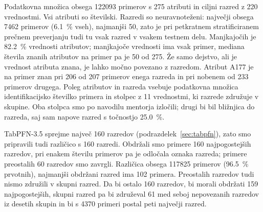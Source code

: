 \documentclass[a4paper,12pt,openright]{book}
\begin{document}
Podatkovna množica obsega \num{122093} primerov s 275 atributi in ciljni
razred z 220 vrednostmi. Vsi atributi so številski. Razredi so neuravnoteženi:
največji obsega 7462 primerov (\SI{6.1}{\percent} vseh), najmanjši 50, zato je
pri petkratnem stratificiranem prečnem preverjanju tudi tu vsak razred v
vsakem testnem delu. Manjkajočih je \SI{82.2}{\percent} vrednosti atributov;
manjkajoče vrednosti ima vsak primer, mediana števila znanih atributov na
primer pa je 50 od 275. Že samo dejstvo, ali je vrednost atributa znana, je
lahko močno povezano z razredom. Atribut A177 je na primer znan pri 206 od 207
primerov enega razreda in pri nobenem od 233 primerov drugega.
Poleg atributov in razreda vsebuje podatkovna množica identifikacijsko
številko primera in stolpec z 11 vrednostmi, ki razrede združuje v skupine.
Oba stolpca smo po navodilu mentorja izločili; drugi bi bil bližnjica do
razreda, saj sam napove razred s točnostjo \SI{25.0}{\percent}.

TabPFN-3.5 sprejme največ 160 razredov (podrazdelek~\ref{sec:tabpfn}), zato
smo pripravili tudi različico s 160 razredi. Obdržali smo primere 160
najpogostejših razredov, pri enakem številu primerov pa je odločala oznaka
razreda; primere preostalih 60 razredov smo zavrgli. Različica obsega
\num{117825} primerov (\SI{96.5}{\percent} prvotnih), najmanjši obdržani razred
ima 102 primera. Preostalih razredov tudi nismo združili v skupni razred. Da
bi ostalo 160 razredov, bi morali obdržati 159 najpogostejših, skupni razred
pa bi združeval 61 med seboj nepovezanih razredov iz desetih skupin in bi s
4370 primeri postal peti največji razred.
\end{document}
